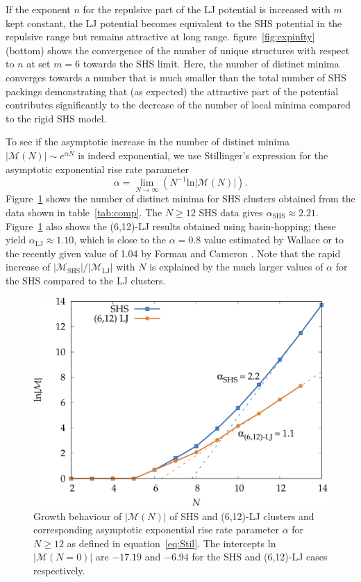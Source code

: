 If the exponent $n$ for the repulsive part of the LJ potential is increased
with $m$ kept constant, the LJ potential becomes equivalent to the \ac{SHS}
potential in the repulsive range but remains attractive at long range.
figure~\ref{fig:expinfty} (bottom) shows the convergence of the number of
unique structures with respect to $n$ at set $m=6$ towards the \ac{SHS} limit. Here, the
number of distinct minima converges towards a number that is much smaller
than the total number of \ac{SHS} packings demonstrating that (as expected) the
attractive part of the potential contributes significantly to the decrease of
the number of local minima compared to the rigid \ac{SHS} model.

To see if the asymptotic increase in the number of distinct minima $|\mathcal{M}(N)| \sim e^{\alpha N}$ 
is indeed exponential, we use Stillinger's expression for the asymptotic exponential rise rate parameter \autocite{Stillinger_Exponentialmultiplicityinherent_1999}
\begin{equation} \label{eq:Stil}
\alpha = \lim_{N\rightarrow \infty} \left( N^{-1} \mathrm{ln} |\mathcal{M}(N)| \right).
\end{equation}
Figure~\ref{fig:asympt} shows the number of distinct minima for \ac{SHS} clusters
obtained from the data shown in table~\ref{tab:comp}.  The $N \geq 12$ \ac{SHS} data
gives $\alpha_\mathrm{SHS}\approx 2.21$. Figure~\ref{fig:asympt} also shows the
(6,12)-LJ results obtained using basin-hopping; these yield
$\alpha_\mathrm{LJ}\approx 1.10$, which is close to the $\alpha=0.8$ value
estimated by Wallace \autocite{Wallace-1997} or to the recently given value of 1.04
by Forman and Cameron \autocite{Forman_ModelingAggregationProcesses_2017}.  Note that the rapid increase of
$|\mathcal{M}_\mathrm{SHS}|/|\mathcal{M}_\mathrm{LJ}|$ with $N$ is explained by
the much larger values of $\alpha$ for the \ac{SHS} compared to the LJ clusters.

\begin{figure}
    \centering
    \includegraphics[width=0.8\columnwidth]{kslj/growth.pdf}
    \caption{Growth behaviour of $|\mathcal{M}(N)|$ of \acs{SHS} and (6,12)-LJ
    clusters and corresponding asymptotic exponential rise rate parameter
    $\alpha$ for $N \geq 12$ as defined in equation~\eqref{eq:Stil}.  The intercepts
    ln$|\mathcal{M}(N=0)|$ are $-17.19$ and $-6.94$ for the \acs{SHS} and
    (6,12)-LJ cases respectively.}
    \label{fig:asympt}
\end{figure}

